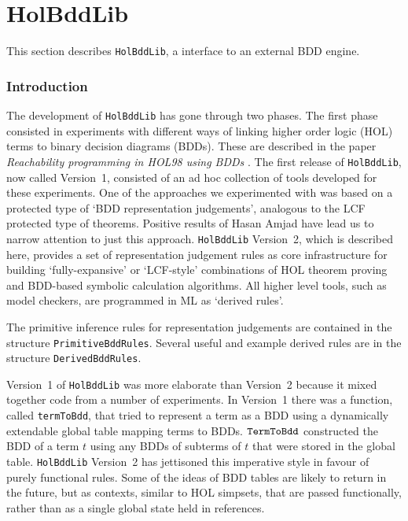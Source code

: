 \documentclass[12pt,fleqn]{book}
\renewcommand{\t}[1]{\mbox{\tt #1}}
\begin{document}
\chapter{HolBddLib}

This section describes {\tt HolBddLib}, a \HOL{} interface to an external BDD engine.

\subsection{Introduction}

The development of {\tt HolBddLib} has gone through two phases.  The
first phase consisted in experiments with different ways of linking
higher order logic (HOL) terms to binary decision diagrams (BDDs).
These are described in the paper {\it Reachability programming in HOL98 using BDDs\/} \cite{tphols2000-Gordon}. The first release of
\t{HolBddLib}, now called Version~1, consisted of an ad hoc collection
of tools developed for these experiments.  One of the approaches we
experimented with was based on a protected type of `BDD representation
judgements', analogous to the LCF protected type of theorems.
Positive results of Hasan Amjad \cite{Amjad:TPHOLs2001} have lead us
to narrow attention to just this approach. \t{HolBddLib} Version~2,
which is described here, provides a set of representation judgement
rules as core infrastructure for building `fully-expansive' or
`LCF-style' combinations of HOL theorem proving and BDD-based symbolic
calculation algorithms. All higher level tools, such as model
checkers, are programmed in ML as `derived rules'.

The primitive inference rules for representation judgements are contained in the structure
{\tt{PrimitiveBddRules}}. Several useful and example  derived rules are in the
structure {\tt{DerivedBddRules}}. 

Version~1 of {\tt{HolBddLib}} was more elaborate than Version~2
because it mixed together code from a number of experiments.
In Version~1 there was a function, called
{\texttt{termToBdd}}, that tried to represent a \HOL{} term as a BDD
using a dynamically extendable global table mapping \HOL{} terms to
BDDs.  $\t{TermToBdd}$ constructed the BDD of a term $t$ using any
BDDs of subterms of $t$ that were stored in the global table.
{\tt{HolBddLib}} Version~2 has jettisoned this imperative style
in favour of purely functional rules. Some of
the ideas of BDD tables are likely to return in the future, but as
contexts, similar to HOL simpsets, that are passed functionally,
rather than as a single global state held in references.
\end{document}
